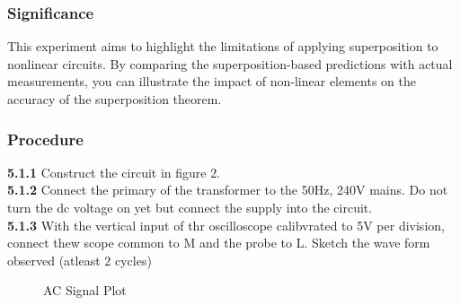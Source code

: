 \subsubsection*{Significance}
This experiment aims to highlight the limitations of applying superposition to nonlinear circuits. By comparing the superposition-based predictions with actual measurements, you can illustrate the impact of non-linear elements on the accuracy of the superposition theorem.


\subsubsection*{Procedure}
\textbf{5.1.1} Construct the circuit in figure 2. \\
\textbf{5.1.2} Connect the primary of the transformer to the 50Hz, 240V mains. Do not turn the dc voltage on yet but connect the supply into the circuit. \\
\textbf{5.1.3} With the vertical input of thr oscilloscope calibvrated to 5V per division, connect thew scope common to M and the probe to L. Sketch the wave form observed (atleast 2 cycles) \\
\begin{figure}[H]
    \centering
    \caption{AC Signal Plot}
    \label{fig:ac_signal_non}
\end{figure}


